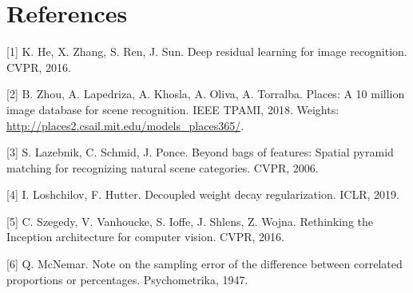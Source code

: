 \documentclass[10pt]{article}
\begin{document}
\newpage
\section*{References}
\small
[1] K. He, X. Zhang, S. Ren, J. Sun. Deep residual learning for image recognition. CVPR, 2016.

[2] B. Zhou, A. Lapedriza, A. Khosla, A. Oliva, A. Torralba. Places: A 10 million image database for scene recognition. IEEE TPAMI, 2018. Weights: \url{http://places2.csail.mit.edu/models_places365/}.

[3] S. Lazebnik, C. Schmid, J. Ponce. Beyond bags of features: Spatial pyramid matching for recognizing natural scene categories. CVPR, 2006.

[4] I. Loshchilov, F. Hutter. Decoupled weight decay regularization. ICLR, 2019.

[5] C. Szegedy, V. Vanhoucke, S. Ioffe, J. Shlens, Z. Wojna. Rethinking the Inception architecture for computer vision. CVPR, 2016.

[6] Q. McNemar. Note on the sampling error of the difference between correlated proportions or percentages. Psychometrika, 1947.
\end{document}
